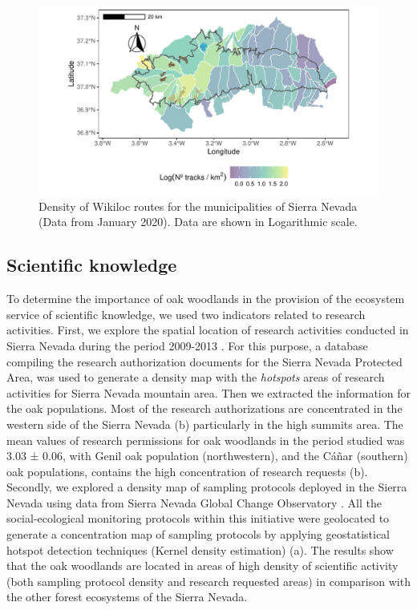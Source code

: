 \begin{figure}
    \centering
    \includegraphics[width=\textwidth]{img/es/es-wikiloc.pdf}\caption{Density of Wikiloc routes for the municipalities of Sierra Nevada (Data from January 2020). Data are shown in Logarithmic scale.}\label{fig:es:wikiloc}
\end{figure}

\subsection{Scientific knowledge}\label{sec:es:cultural-scientific} 
To determine the importance of oak woodlands in the provision of the ecosystem service of scientific knowledge, we used two indicators related to research activities. First, we explore the spatial location of research activities conducted in Sierra Nevada during the period 2009-2013 \autocites{Zamoraetal2017MonitoringGlobal}. For this purpose, a database compiling the research authorization documents for the Sierra Nevada Protected Area, was used to generate a density map with the \emph{hotspots} areas of research activities for Sierra Nevada mountain area. Then we extracted the information for the oak populations. Most of the research authorizations are concentrated in the western side of the Sierra Nevada (b) particularly in the high summits area. The mean values of research permissions for oak woodlands in the period studied was 3.03 ± 0.06, with Genil oak population (northwestern), and the Cáñar (southern) oak populations, contains the high concentration of research requests (b). 
Secondly, we explored a density map of sampling protocols deployed in the Sierra Nevada \autocites{Zamoraetal2017MonitoringGlobal} using data from Sierra Nevada Global Change Observatory \autocites{Zamoraetal2016GlobalChange}. All the social-ecological monitoring protocols within this initiative were geolocated to generate a concentration map of sampling protocols by applying geostatistical hotspot detection techniques (Kernel density estimation) \autocites[][see]{Zamoraetal2016GlobalChange} (a). The results show that the oak woodlands are located in areas of high density of scientific activity (both sampling protocol density and research requested areas) in comparison with the other forest ecosystems of the Sierra Nevada.

